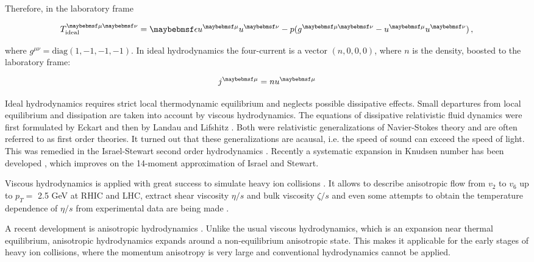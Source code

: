 Therefore, in the laboratory frame

\begin{equation} \label{eq:tmn_id_fluid}
  \Tmn_{\mathrm{ideal}} = \epsilon u^{\mu} u^{\nu} - p (g^{\mu\nu} - u^{\mu}u^{\nu}) \,,
\end{equation}

where $g^{\mu\nu} = \mathrm{diag}(1, -1, -1, -1)$. In ideal hydrodynamics the
four-current is a vector $(n,0,0,0)$, where $n$ is the density, boosted to the
laboratory frame:

\begin{equation} \label{eq:jmu_id_fluid}
  \jmu = n u^{\mu}
\end{equation}

Ideal hydrodynamics requires strict local thermodynamic equilibrium and
neglects possible dissipative effects. Small departures from local
equilibrium and dissipation are taken into account by  viscous
hydrodynamics. The equations of dissipative relativistic fluid dynamics
were first formulated by Eckart \cite{Eckart:1940te} and then by Landau and
Lifshitz \cite{LL_hydro}. Both were relativistic generalizations of
Navier-Stokes theory and are often referred to as first order theories. It
turned out that these generalizations are acausal, i.e. the speed of sound can
exceed the speed of light.  This was remedied in the Israel-Stewart second
order hydrodynamics \cite{Israel:1979wp}.  Recently a systematic expansion in
Knudsen number has been developed \cite{Denicol:2012cn}, which improves on the
14-moment approximation of Israel and Stewart.

Viscous hydrodynamics is applied with great success to simulate heavy ion
collisions
\cite{Teaney:2003kp,Romatschke:2007mq,Luzum:2008cw,Schenke:2010rr,Song:2007fn}.
It allows to describe anisotropic flow from $v_2$ to $v_6$ up to $p_T = $ 2.5 GeV
at RHIC and LHC, extract shear viscosity $\eta/s$ and bulk viscosity $\zeta/s$
and even some attempts to obtain the temperature dependence of $\eta/s$ from
experimental data are being made
\cite{Molnar:2014zha,Niemi:2015bpj,Karpenko:2015xea}.

A recent development is anisotropic hydrodynamics
\cite{Strickland:2014pga,Bazow:2013ifa}. Unlike the usual viscous
hydrodynamics, which is an expansion near thermal equilibrium, anisotropic
hydrodynamics expands around a non-equilibrium anisotropic state. This makes it
applicable for the early stages of heavy ion collisions, where the momentum anisotropy
is very large and conventional hydrodynamics cannot be applied.

